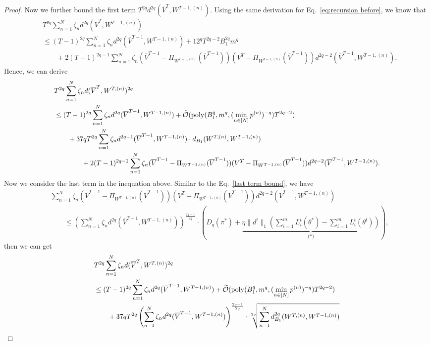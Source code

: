 \begin{proof}
Now we further bound the first term $T^{2q}d^{2q}(\overline{V}^{T}, W^{T-1,(n)}).$ 
Using the same derivation for Eq.~\eqref{eq:recursion before}, 
we know that \begin{align*}
    &T^{2q} \sum_{n=1}^N \zeta_nd^{2q}(\overline{V}^{T}, W^{T-1,(n)}) \\&\le (T-1)^{2q} \sum_{n=1}^N \zeta_nd^{2q}(\overline{V}^{T-1}, W^{T-1,(n)}) + 12^qT^{2q-2}B_1^{2q}m^q\\
&\qquad + 2(T-1)^{2q-1}\sum_{n=1}^N \zeta_n(\overline{V}^{T-1}-\Pi_{W^{T-1,(n)}}(\overline{V}^{T-1}))(V^T-\Pi_{W^{T-1,(n)}}(\overline{V}^{T-1}))d^{2q-2}(\overline{V}^{T-1}, W^{T-1,(n)}).
\end{align*}
Hence, we can derive 
\begin{align*}
    &T^{2q}\sum_{n=1}^N \zeta_n d(\overline{V}^T, W^{T,(n)})^{2q} \nonumber\\&\le (T-1)^{2q} \sum_{n=1}^N \zeta_nd^{2q}(\overline{V}^{T-1}, W^{T-1,(n)})  + \widetilde{\mathcal{O}}(\mathrm{poly}(B_1^{q},m^{q}, (\min_{n \in [N]}p^{(n)})^{-q})T^{2q-2}) \\&\qquad +37qT^{2q}\sum_{n=1}^N \zeta_nd^{2q-1}(\overline{V}^{T-1}, W^{T-1,(n)})\cdot d_{B_1}(W^{T,(n)}, W^{T-1,(n)}) \\
&\qquad\qquad   + 2(T-1)^{2q-1}\sum_{n=1}^N \zeta_n(\overline{V}^{T-1}-\Pi_{W^{T-1,(n)}}(\overline{V}^{T-1}))(V^T-\Pi_{W^{T-1,(n)}}(\overline{V}^{T-1}))d^{2q-2}(\overline{V}^{T-1}, W^{T-1,(n)}).
\end{align*}
Now we consider the last term in the inequation above. Similar to the Eq.~\eqref{last term bound}, we have 
\begin{align}
&\sum_{n=1}^N \zeta_n(\overline{V}^{T-1}-\Pi_{W^{T-1,(n)}}(\overline{V}^{T-1}))(V^T-\Pi_{W^{T-1,(n)}}(\overline{V}^{T-1}))d^{2q-2}(\overline{V}^{T-1}, W^{T-1,(n)})\nonumber\\&\qquad \le \left(\sum_{n=1}^N \zeta_n d^{2q}(\overline{V}^{T-1}, W^{T-1,(n)})\right)^{\frac{2q-1}{2q}} \cdot \left(D_{q}(\pi^*) + \underbrace{\eta \|d^t\|_1\left(\sum_{i=1}^m L_i^t(\theta^*) -  \sum_{i=1}^m L_i^t(\theta^t)\right)}_{\textrm{($\ast$)}}\right),\nonumber
\end{align}
then we can get 
\begin{align*}
    &T^{2q}\sum_{n=1}^N \zeta_n d(\overline{V}^T, W^{T,(n)})^{2q} \nonumber\\&\le (T-1)^{2q} \sum_{n=1}^N \zeta_nd^{2q}(\overline{V}^{T-1}, W^{T-1,(n)})  + \widetilde{\cO}(\mathrm{poly}(B_1^{q},m^{q}, (\min_{n \in [N]}p^{(n)})^{-q})T^{2q-2}) \\&\qquad +37qT^{2q}\left(\sum_{n=1}^N \zeta_nd^{2q}(\overline{V}^{T-1}, W^{T-1,(n)})\right)^{\frac{2q-1}{2q}}\cdot \sqrt[2q]{\sum_{n=1}^N d_{B_1}^{2q}(W^{T,(n)}, W^{T-1,(n)}) }\\

\end{align*}
\end{proof}
